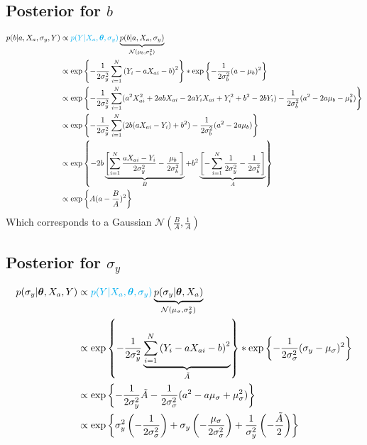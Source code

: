 \documentclass[10pt]{article}
\renewcommand{\vec}[1]{\boldsymbol{#1}}
\begin{document}
    \subsection{Posterior for $b$}
    \begin{align}
        p(b|a, X_a, \sigma_y, Y) &\propto {\color{cyan} p(Y | X_a, \vec{\theta}, \sigma_y)} \underbrace{p(b | a, X_a, \sigma_{y})}_{\mathcal{N}(\mu_b, \sigma_b^2)} \\
        &\propto \exp\left\{ - \frac{1}{2\sigma_y^2} \sum_{i=1}^N \left( Y_i - a X_{ai} - b \right)^2 \right\} * \exp\left\{ - \frac{1}{2\sigma_b^2} ( a - \mu_b )^2 \right\} \\
        &\propto \exp\left\{ - \frac{1}{2\sigma_y^2} \sum_{i=1}^N (a^2 X_{ai}^2  + 2 a b X_{ai} - 2 a Y_i X_{ai} + Y_i^2 + b^2 -2 b Y_i )- \frac{1}{2\sigma_b^2} ( a^2 - 2 a \mu_b - \mu_b^2 ) \right\} \\
        &\propto \exp\left\{ - \frac{1}{2\sigma_y^2} \sum_{i=1}^N (2 b (a X_{ai} - Y_i) + b^2 ) - \frac{1}{2\sigma_b^2} ( a^2 - 2 a \mu_b ) \right\} \\
        &\propto \exp\left\{ - 2 b \underbrace{\left[ \sum_{i=1}^N \frac{a X_{ai} - Y_i}{2\sigma_y^2} - \frac{\mu_b}{2\sigma_b^2} \right]}_{B} + b^2 \underbrace{\left[ - \sum_{i=1}^N \frac{1}{2\sigma_y^2}  - \frac{1}{2\sigma_b^2} \right]}_{A} \right\} \\
        &\propto \exp\left\{A (a - \frac{B}{A})^2\right\}
    \end{align}
    Which corresponds to a Gaussian $\mathcal{N}(\frac{B}{A}, \frac{1}{A})$
    
    
    \subsection{Posterior for $\sigma_y$}
    \begin{align}
        p(\sigma_y | \vec{\theta}, X_a, Y) &\propto {\color{cyan} p(Y | X_a, \vec{\theta}, \sigma_y)} \underbrace{p(\sigma_y | \vec{\theta}, X_a)}_{\mathcal{N}(\mu_{\sigma}, \sigma_{\sigma}^2)} \\
        &\propto \exp\left\{ - \frac{1}{2\sigma_y^2} \underbrace{\sum_{i=1}^N \left( Y_i - a X_{ai} - b \right)^2}_{\tilde{A}} \right\} * \exp\left\{ - \frac{1}{2\sigma_{\sigma}^2} ( \sigma_y - \mu_{\sigma} )^2 \right\} \\
        &\propto \exp\left\{ - \frac{1}{2\sigma_y^2} \tilde{A} - \frac{1}{2\sigma_{\sigma}^2} ( a^2 - a \mu_{\sigma} + \mu_{\sigma}^2 ) \right\} \\
        &\propto \exp\left\{ \sigma_y^2 \left( - \frac{1}{2\sigma_{\sigma}^2} \right) + \sigma_y \left( -  \frac{\mu_{\sigma}}{2\sigma_{\sigma}^2}\right) + \frac{1}{\sigma_y^2} \left( - \frac{\tilde{A}}{2} \right) \right\} 
    \end{align}
    
\end{document}
